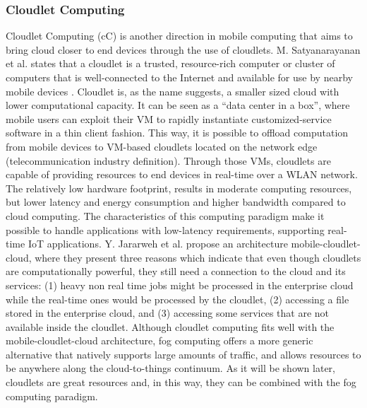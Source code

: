\subsubsection{Cloudlet Computing}
Cloudlet Computing (cC) is another direction in mobile computing that aims to bring cloud closer to end devices through the use of cloudlets. M. Satyanarayanan et al. states that a cloudlet is a trusted, resource-rich computer or cluster of computers that is well-connected to the Internet and available for use by nearby mobile devices \cite{satyanarayanan2009case}. Cloudlet is, as the name suggests, a smaller sized cloud with lower computational capacity. It can be seen as a ``data center in a box'', where mobile users can exploit their VM to rapidly instantiate customized-service software in a thin client fashion. This way, it is possible to offload computation from mobile devices to VM-based cloudlets located on the network edge (telecommunication industry definition). Through those VMs, cloudlets are capable of providing resources to end devices in real-time over a WLAN network. The relatively low hardware footprint, results in moderate computing resources, but lower latency and energy consumption and higher bandwidth compared to cloud computing. The characteristics of this computing paradigm make it possible to handle applications with low-latency requirements, supporting real-time IoT applications. Y. Jararweh et al. \cite{jararweh2013resource} propose an architecture mobile-cloudlet-cloud, where they present three reasons which indicate that even though cloudlets are computationally powerful, they still need a connection to the cloud and its services: (1) heavy non real time jobs might be processed in the enterprise cloud while the real-time ones would be processed by the cloudlet, (2) accessing a file stored in the enterprise cloud, and (3) accessing some services that are not available inside the cloudlet. Although cloudlet computing fits well with the mobile-cloudlet-cloud architecture, fog computing offers a more generic alternative that natively supports large amounts of traffic, and allows resources to be anywhere along the cloud-to-things continuum. As it will be shown later, cloudlets are great resources and, in this way, they can be combined with the fog computing paradigm.

